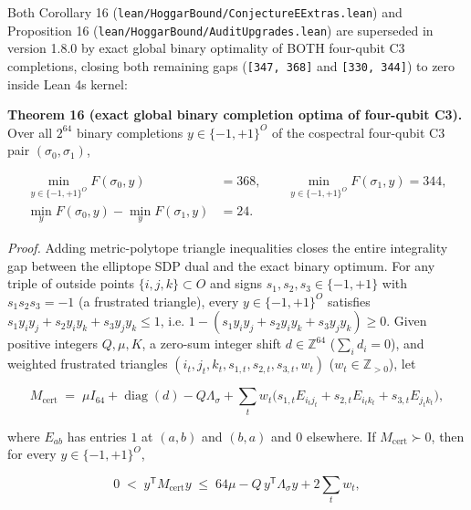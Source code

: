 \documentclass[11pt,a4paper]{article}
\newcommand{\gt}{>}
\begin{document}
Both Corollary 16 (\nolinkurl{lean/HoggarBound/ConjectureEExtras.lean}) and Proposition 16\textquotesingle{}
(\nolinkurl{lean/HoggarBound/AuditUpgrades.lean}) are superseded in version 1.8.0 by exact global binary optimality
of BOTH four-qubit C3 completions, closing both remaining gaps (\texttt{{[}347,\ 368{]}} and \texttt{{[}330,\ 344{]}}) to zero
inside Lean 4\textquotesingle s kernel:

\textbf{Theorem 16\textquotesingle\textquotesingle{} (exact global binary completion optima of four-qubit C3).} Over all \(2^{64}\) binary
completions \(y \in \{-1, +1\}^O\) of the cospectral four-qubit C3 pair \((\sigma_0, \sigma_1)\),

\begin{equation}\tag{C13}\begin{aligned}
\min_{y \in \{-1, +1\}^O} F(\sigma_0, y) &= 368, \qquad \min_{y \in \{-1, +1\}^O} F(\sigma_1, y) = 344, \\
\min_y F(\sigma_0, y) - \min_y F(\sigma_1, y) &= 24.
\end{aligned}\end{equation}

\emph{Proof.} Adding metric-polytope triangle inequalities closes the entire integrality gap between the
elliptope SDP dual and the exact binary optimum. For any triple of outside points \(\{i, j, k\} \subset O\)
and signs \(s_1, s_2, s_3 \in \{-1, +1\}\) with \(s_1 s_2 s_3 = -1\) (a frustrated triangle), every
\(y \in \{-1, +1\}^O\) satisfies \(s_1 y_i y_j + s_2 y_i y_k + s_3 y_j y_k \le 1\), i.e.
\(1 - (s_1 y_i y_j + s_2 y_i y_k + s_3 y_j y_k) \ge 0\). Given positive integers \(Q, \mu, K\), a zero-sum
integer shift \(d \in \mathbb{Z}^{64}\) (\(\sum_i d_i = 0\)), and weighted frustrated triangles
\((i_t, j_t, k_t, s_{1,t}, s_{2,t}, s_{3,t}, w_t)\) (\(w_t \in \mathbb{Z}_{ \gt 0}\)), let

\[M_{\mathrm{cert}} \;=\; \mu I_{64} + \operatorname{diag}(d) - Q \Lambda_\sigma +
  \sum_t w_t \big(s_{1,t} E_{i_t j_t} + s_{2,t} E_{i_t k_t} + s_{3,t} E_{j_t k_t}\big),\]

where \(E_{ab}\) has entries \(1\) at \((a, b)\) and \((b, a)\) and \(0\) elsewhere. If \(M_{\mathrm{cert}} \succ 0\),
then for every \(y \in \{-1, +1\}^O\),

\[0 \;<\; y^{\mathsf T} M_{\mathrm{cert}} y \;\le\;
  64\mu - Q\,y^{\mathsf T} \Lambda_\sigma y + 2 \sum_t w_t ,\]
\end{document}

